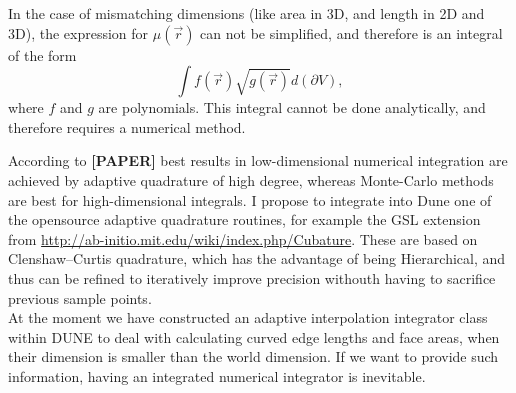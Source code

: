 \noindent
In the case of mismatching dimensions (like area in 3D, and length in 2D and 3D), the expression for $\mu(\vec{r})$ can not be simplified, and therefore is an integral of the form \[\int f(\vec{r}) \sqrt{g(\vec{r})} d(\partial V),\] where $f$ and $g$ are polynomials. This integral cannot be done analytically, and therefore requires a numerical method.

\noindent
According to \textbf{[PAPER]} best results in low-dimensional numerical integration are achieved by adaptive quadrature of high degree, whereas Monte-Carlo methods are best for high-dimensional integrals. I propose to integrate into Dune one of the opensource adaptive quadrature routines, for example the GSL extension from \url{http://ab-initio.mit.edu/wiki/index.php/Cubature}. These are based on Clenshaw–Curtis quadrature, which has the advantage of being Hierarchical, and thus can be refined to iteratively improve precision withouth having to sacrifice previous sample points. \\

\noindent
At the moment we have constructed an adaptive interpolation integrator class within DUNE to deal with calculating curved edge lengths and face areas, when their dimension is smaller than the world dimension. If we want to provide such information, having an integrated numerical integrator is inevitable.
